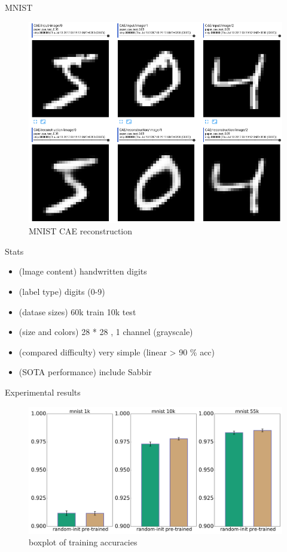 \documentclass[final]{beamer}
\newlength{\onecolwid}
\begin{document}
\begin{frame}[t]
\begin{columns}[t]
\begin{column}{\onecolwid}
\begin{block}{MNIST}

\begin{figure}
\includegraphics[width=0.8\linewidth]{graphics/mnist_reconstructions.png}
\caption{MNIST CAE reconstruction}
\end{figure}

\end{block}

\begin{block}{Stats}
\begin{itemize}
\item (lmage content) handwritten digits 
\item (label type) digits (0-9)
\item (datase sizes) 60k train 10k test
\item (size and colors) 28 * 28 , 1 channel (grayscale)
\item (compared difficulty) very simple (linear > 90 \% acc)
\item (SOTA performance) include Sabbir

\end{itemize}
\end{block}

\begin{block}{Experimental results}

\begin{figure}
\includegraphics[width=\linewidth]{box_plots/boxplots_mnist.png}
\caption{boxplot of training accuracies}
\end{figure}


\end{block}
\end{column}
\end{columns}
\end{frame}
\end{document}
